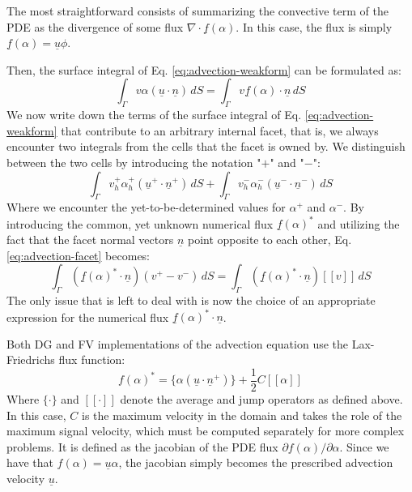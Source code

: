 \documentclass[asi,article,submit,moreauthors]{Definitions/mdpi}
\begin{document}
The most straightforward consists of summarizing the convective term of the PDE as the divergence of some flux $\nabla \cdot \underline{f}(\alpha)$.
In this case, the flux is simply $\underline{f}(\alpha) = \underline{u} \phi$.

Then, the surface integral of Eq. \ref{eq:advection-weakform} can be formulated as:
\begin{equation}
    \int_\Gamma v \alpha (\underline{u}\cdot\underline{n})\,dS = \int_\Gamma v \underline{f}(\alpha)\cdot\underline{n}\,dS
\end{equation}
We now write down the terms of the surface integral of Eq. \ref{eq:advection-weakform} that contribute to an arbitrary internal facet, that is,  we always encounter two integrals from the cells that the facet is owned by.
We distinguish between the two cells by introducing the notation "$+$" and "$-$":
\begin{equation}\label{eq:advection-facet}
    \int_\Gamma v_h^+ \alpha_h^+ (\underline{u}^+\cdot\underline{n}^+) \,dS + \int_\Gamma v_h^- \alpha_h^- (\underline{u}^-\cdot\underline{n}^-) \,dS
\end{equation}
Where we encounter the yet-to-be-determined values for $\alpha^+$ and $\alpha^-$.
By introducing the common, yet unknown numerical flux $\underline{f}(\alpha)^*$ and utilizing the fact that the facet normal vectors $\underline{n}$ point opposite to each other, Eq. \ref{eq:advection-facet} becomes:
\begin{equation}
     \int_\Gamma \left(\underline{f}(\alpha)^* \cdot \underline{n}\right)(v^+ - v^-) \,dS = \int_\Gamma \left(\underline{f}(\alpha)^* \cdot \underline{n}\right) [\![v]\!] \,dS
\end{equation}
The only issue that is left to deal with is now the choice of an appropriate expression for the numerical flux $\underline{f}(\alpha)^* \cdot \underline{n}$.

Both DG and FV implementations of the advection equation use the Lax-Friedrichs flux function:
\begin{equation}
    f(\alpha)^* = \{ \alpha (\underline{u} \cdot \underline{n}^+) \} + \frac{1}{2} C [\![ \alpha ]\!]  
\end{equation}
Where $\{\cdot\}$ and $[\![\cdot]\!]$ denote the average and jump operators as defined above.
In this case, $C$ is the maximum velocity in the domain and takes the role of the maximum signal velocity, which must be computed separately for more complex problems.
It is defined as the jacobian of the PDE flux $\partial f(\alpha) / \partial \alpha$.
Since we have that $f(\alpha) = \underline{u} \alpha$, the jacobian simply becomes the prescribed advection velocity $\underline{u}$.
\end{document}
